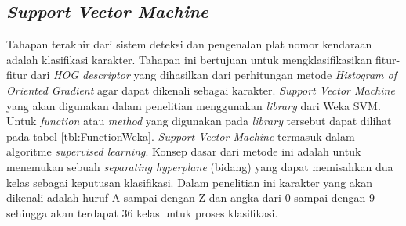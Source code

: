 \subsection{\textit{Support Vector Machine}}
\noindent Tahapan terakhir dari sistem deteksi dan pengenalan plat nomor kendaraan adalah klasifikasi karakter. Tahapan ini bertujuan untuk mengklasifikasikan fitur-fitur dari \textit{HOG descriptor} yang dihasilkan dari perhitungan metode \textit{Histogram of Oriented Gradient} agar dapat dikenali sebagai karakter. \textit{Support Vector Machine} yang akan digunakan dalam penelitian menggunakan \textit{library} dari Weka SVM. Untuk \textit{function} atau \textit{method} yang digunakan pada \textit{library} tersebut dapat dilihat pada tabel \ref{tbl:FunctionWeka}. \textit{Support Vector Machine} termasuk dalam algoritme \textit{supervised learning}. Konsep dasar dari metode ini adalah untuk menemukan sebuah \textit{separating hyperplane} (bidang) yang dapat memisahkan dua kelas sebagai keputusan klasifikasi. Dalam penelitian ini karakter yang akan dikenali adalah huruf A sampai dengan Z dan angka dari 0 sampai dengan 9 sehingga akan terdapat 36 kelas untuk proses klasifikasi.



\newpage